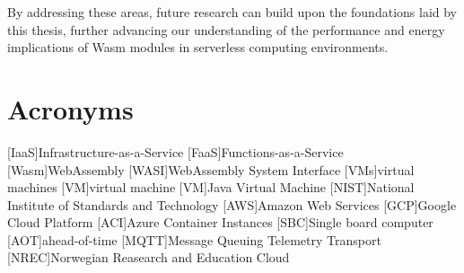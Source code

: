 \documentclass[
  table]{report}
\begin{document}
By addressing these areas, future research can build upon the
foundations laid by this thesis, further advancing our understanding of
the performance and energy implications of Wasm modules in serverless
computing environments.

\chapter*{Acronyms}
\begin{acronym}
  [IaaS]{Infrastructure-as-a-Service}
  [FaaS]{Functions-as-a-Service}
  [Wasm]{WebAssembly}
  [WASI]{WebAssembly System Interface}
  [VMs]{virtual machines}
  [VM]{virtual machine}
  [VM]{Java Virtual Machine}
  [NIST]{National Institute of Standards and Technology}
  [AWS]{Amazon Web Services}
  [GCP]{Google Cloud Platform}
  [ACI]{Azure Container Instances}
  [SBC]{Single board computer}
  [AOT]{ahead-of-time}
  [MQTT]{Message Queuing Telemetry Transport}
  [NREC]{Norwegian Reasearch and Education Cloud}
\end{acronym}

\printbibliography
\end{document}
